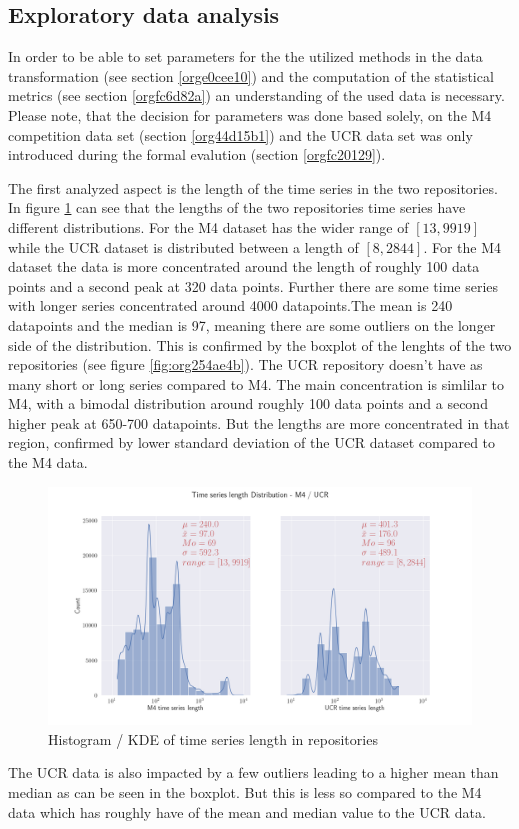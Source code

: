 \documentclass[phd,black, hidelinks]{PrincetonThesis}
\begin{document}
\subsection{Exploratory data analysis}
\label{sec:orgb1d9065}
\label{orgd07bcf6}
In order to be able to set parameters for the the utilized methods in the data transformation (see section \ref{orge0cee10}) and the computation of the statistical metrics (see section \ref{orgfc6d82a}) an understanding of the used data is necessary. Please note, that the decision for parameters was done based solely, on the M4 competition data set (section \ref{org44d15b1}) and the UCR data set was only introduced during the formal evalution (section \ref{orgfc20129}).

The first analyzed aspect is the length of the time series in the two repositories. In figure \ref{fig:orgd8e9d3b} can see that the lengths of the two repositories time series have different distributions. For the M4 dataset has the wider range of \([13, 9919]\) while the UCR dataset is distributed between a length of \([8, 2844]\). For the M4 dataset the data is more concentrated around the length of roughly 100 data points and a second peak at 320 data points. Further there are some time series with longer series concentrated around 4000 datapoints.The mean is 240 datapoints and the median is 97, meaning there are some outliers on the longer side of the distribution. This is confirmed by the boxplot of the lenghts of the two repositories (see figure \ref{fig:org254ae4b}). The UCR repository doesn't have as many short or long series compared to M4. The main concentration is simlilar to M4, with a bimodal distribution around roughly 100 data points and a second higher peak at 650-700 datapoints. But the lengths are more concentrated in that region, confirmed by lower standard deviation of the UCR dataset compared to the M4 data.
\begin{figure}[htbp]
\centering
\includegraphics[width=.9\linewidth]{./img/ts_m4_ucr_length.png}
\caption{\label{fig:orgd8e9d3b}Histogram / KDE of time series length in repositories}
\end{figure}
The UCR data is also impacted by a few outliers leading to a higher mean than median as can be seen in the boxplot. But this is less so compared to the M4 data which has roughly have of the mean and median value to the UCR data.
\end{document}
